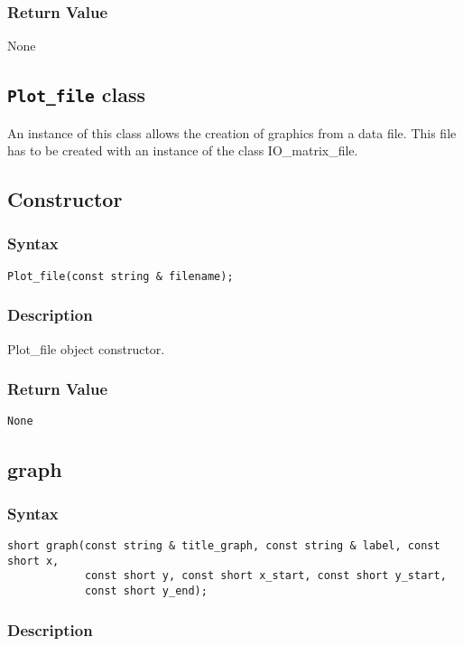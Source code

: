\documentclass[dvips,11pt,fleqn]{report}
\begin{document}
\subsubsection*{Return Value}

None

\newpage

\subsection*{\texttt{Plot\_file} class}
An instance of this class allows the creation of graphics from a data
file. This file has to be created with an instance of the class IO\_matrix\_file. 
\subsection*{Constructor}
\subsubsection*{Syntax}
\begin{verbatim}
Plot_file(const string & filename);
\end{verbatim}

\subsubsection*{Description}   
Plot\_file object constructor.

\subsubsection*{Return Value}

{\tt None}
 \newpage 

\subsection*{graph}
\subsubsection*{Syntax}
\begin{verbatim}
short graph(const string & title_graph, const string & label, const short x,
            const short y, const short x_start, const short y_start,
            const short y_end);
\end{verbatim}

\subsubsection*{Description}   
\end{document}

